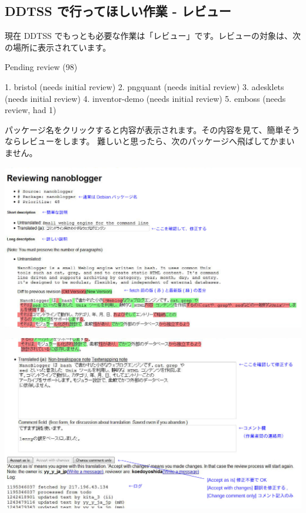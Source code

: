 \documentclass[mingoth,a4paper]{jsarticle}
\begin{document}
\subsection{DDTSS で行ってほしい作業 - レビュー}

現在 DDTSS でもっとも必要な作業は「レビュー」です。レビューの対象は、次の場所に表示されています。

\begin{commandline}
Pending review (98)

   1. bristol (needs initial review)
   2. pngquant (needs initial review)
   3. adesklets (needs initial review)
   4. inventor-demo (needs initial review)
   5. emboss (needs review, had 1)
\end{commandline}

パッケージ名をクリックすると内容が表示されます。その内容を見て、簡単そうならレビューをします。
難しいと思ったら、次のパッケージへ飛ばしてかまいません。

  \includegraphics[width=170mm]{image200906/nanoblogger101.jpg}

  \includegraphics[width=170mm]{image200906/nanoblogger102.jpg}
\end{document}
